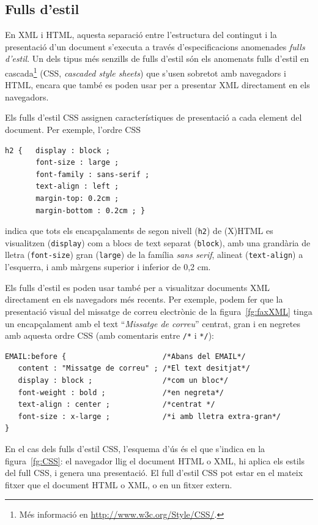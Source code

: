 \subsection{Fulls d'estil}
En XML i HTML, aquesta separació entre l'estructura del contingut i la
presentació d'un document s'executa a través d'especificacions
anomenades \emph{fulls d'estil}. Un dels tipus més senzills de fulls
d'estil són els anomenats fulls d'estil en cascada\footnote{Més
  informació en \url{http://www.w3c.org/Style/CSS/}.} (CSS,
\emph{cascaded style sheets}) que s'usen sobretot amb navegadors i
HTML, encara que també es poden usar per a presentar XML directament
en els navegadors.

Els fulls d'estil CSS assignen característiques de presentació a cada
element del document. Per exemple, l'ordre CSS
\begin{verbatim}
h2 {   display : block ;
       font-size : large ;
       font-family : sans-serif ;
       text-align : left ;
       margin-top: 0.2cm ;
       margin-bottom : 0.2cm ; }
\end{verbatim}
indica que tots els encapçalaments de segon nivell (\texttt{h2}) de
(X)HTML es visualitzen (\texttt{display}) com a blocs de text separat
(\texttt{block}), amb una grandària de lletra (\texttt{font-size})
gran (\texttt{large}) de la família \emph{sans serif}, alineat
(\texttt{text-align}) a l'esquerra, i amb màrgens superior i inferior
de 0,2 cm.

Els fulls d'estil es poden usar també per a visualitzar documents XML
directament en els navegadors més recents. Per exemple, podem fer que
la presentació visual del missatge de correu electrònic de la
figura~\ref{fg:faxXML} tinga un encapçalament amb el text
``\emph{Missatge de correu}'' centrat, gran i en negretes amb aquesta
ordre CSS (amb comentaris entre \texttt{/*} i \texttt{*/}):
\begin{verbatim}
EMAIL:before {                      /*Abans del EMAIL*/
   content : "Missatge de correu" ; /*El text desitjat*/
   display : block ;                /*com un bloc*/
   font-weight : bold ;             /*en negreta*/
   text-align : center ;            /*centrat */
   font-size : x-large ;            /*i amb lletra extra-gran*/
}
\end{verbatim}

En el cas dels fulls d'estil CSS, l'esquema d'ús és el que s'indica en
la figura~\ref{fg:CSS}: el navegador llig el document HTML o XML, hi
aplica els estils del full CSS, i genera una presentació. El full
d'estil CSS pot estar en el mateix fitxer que el document HTML o XML,
o en un fitxer extern.

